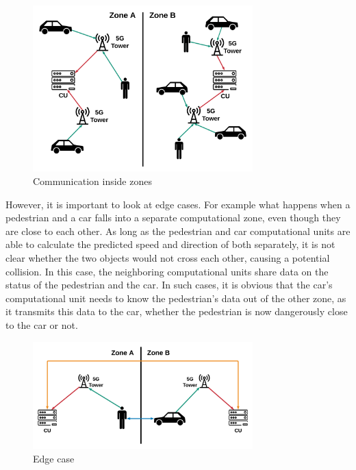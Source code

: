 \documentclass[conference]{IEEEtran}
\begin{document}
\begin{figure}[ht]
    \centering
    \includegraphics[width=8.5cm]{./pics/Communication.png}
    \caption{Communication inside zones}
\end{figure}

However, it is important to look at edge cases. For example what happens when a pedestrian and a car falls into a separate computational zone, even though they are close to each other. As long as the pedestrian and car computational units are able to calculate the predicted speed and direction of both separately, it is not clear whether the two objects would not cross each other, causing a potential collision. In this case, the neighboring computational units share data on the status of the pedestrian and the car. In such cases, it is obvious that the car’s computational unit needs to know the pedestrian’s data out of the other zone, as it transmits this data to the car, whether the pedestrian is now dangerously close to the car or not.

\begin{figure}[ht]
    \centering
    \includegraphics[width=8.5cm]{./pics/Edge case.png}
    \caption{Edge case}
\end{figure}
\end{document}
